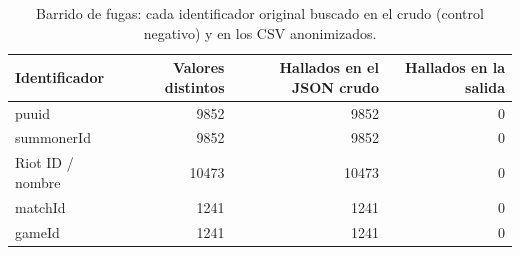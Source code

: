 \begin{table}[H]
\centering
\small
\caption{Barrido de fugas: cada identificador original buscado en el crudo (control negativo) y en los CSV anonimizados.}
\label{tab:barrido}
\begin{tabular}{lrrr}
\toprule
Identificador & Valores distintos & Hallados en el JSON crudo & Hallados en la salida \\
\midrule
puuid & 9852 & 9852 & 0 \\
summonerId & 9852 & 9852 & 0 \\
Riot ID / nombre & 10473 & 10473 & 0 \\
matchId & 1241 & 1241 & 0 \\
gameId & 1241 & 1241 & 0 \\
\bottomrule
\end{tabular}
\end{table}
